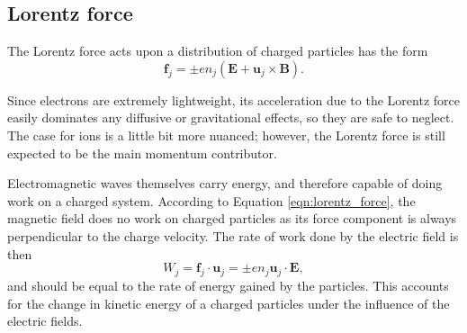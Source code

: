 \subsection{Lorentz force}
The Lorentz force acts upon a distribution of charged particles has the form
\begin{equation}
    \mathbf{f}_j = \pm en_j \left(\mathbf{E} + \mathbf{u}_j \times \mathbf{B} \right).
    \label{eqn:lorentz_force}
\end{equation}

Since electrons are extremely lightweight, its acceleration due to the Lorentz force easily dominates any diffusive or gravitational effects, so they are safe to neglect. The case for ions is a little bit more nuanced;
however, the Lorentz force is still expected to be the main momentum contributor.

Electromagnetic waves themselves carry energy, and therefore capable of doing work on a charged system. According to Equation \ref{eqn:lorentz_force}, the magnetic field does no work on charged particles as its
force component is always perpendicular to the charge velocity. The rate of work done by the electric field is then
\begin{equation}
    W_j = \mathbf{f}_j \cdot \mathbf{u}_j = \pm en_j \mathbf{u}_j \cdot \mathbf{E},
\end{equation}
and should be equal to the rate of energy gained by the particles. This accounts for the change in kinetic energy of a charged particles under the influence of the electric fields.